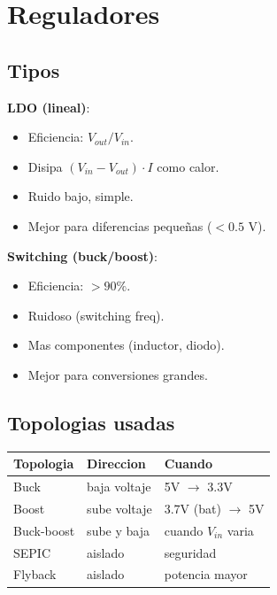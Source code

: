 \documentclass[11pt,a4paper,oneside,openright]{book}
\begin{document}
\chapter{Reguladores}

\section{Tipos}

\textbf{LDO (lineal)}:
\begin{itemize}[leftmargin=2em]
  \item Eficiencia: $V_{out}/V_{in}$.
  \item Disipa $(V_{in} - V_{out}) \cdot I$ como calor.
  \item Ruido bajo, simple.
  \item Mejor para diferencias pequeñas ($< 0.5$ V).
\end{itemize}

\textbf{Switching (buck/boost)}:
\begin{itemize}[leftmargin=2em]
  \item Eficiencia: $> 90\%$.
  \item Ruidoso (switching freq).
  \item Mas componentes (inductor, diodo).
  \item Mejor para conversiones grandes.
\end{itemize}

\section{Topologias usadas}

\begin{center}
\begin{tabular}{lll}
\toprule
\textbf{Topologia} & \textbf{Direccion} & \textbf{Cuando} \\
\midrule
Buck                & baja voltaje      & 5V $\to$ 3.3V \\
Boost               & sube voltaje      & 3.7V (bat) $\to$ 5V \\
Buck-boost          & sube y baja        & cuando $V_{in}$ varia \\
SEPIC                & aislado          & seguridad \\
Flyback              & aislado            & potencia mayor \\
\bottomrule
\end{tabular}
\end{center}
\end{document}
